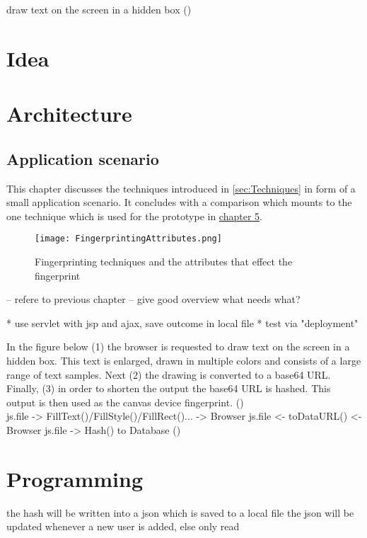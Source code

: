  draw text on the screen in a hidden box
(\textcite{jkula17})\\


\section{Idea}

\section{Architecture}

\subsection{Application scenario}

This chapter discusses the techniques introduced in \autoref{sec:Techniques} in form of a small application scenario. It concludes with a comparison which mounts to the one technique which is used for the prototype in \hyperref[cha:implementation]{chapter 5}.

\begin{figure}[H]
	\centering
	\texttt{[image: FingerprintingAttributes.png]}
	\caption{Fingerprinting techniques and the attributes that effect the fingerprint}
	\label{BrowserSpecification}
\end{figure}

-- refere to previous chapter
-- give good overview what needs what?

* use servlet with jsp and ajax, save outcome in local file
* test via "deployment"

In the figure below (1) the browser is requested to draw text on the screen in a hidden box. This text is enlarged, drawn in multiple colors and consists of a large range of text samples. Next (2) the drawing is converted to a base64 URL. Finally, (3) in order to shorten the output the base64 URL is hashed. This output is then used as the canvas device fingerprint. 
(\textcite{jkula17})\\

js.file -> FillText()/FillStyle()/FillRect()... -> Browser
js.file <- toDataURL() <- Browser
js.file -> Hash() to Database
(\textcite{jkula17})

\section{Programming}

the hash will be written into a json which is saved to a local file
the json will be updated whenever a new user is added, else only read

